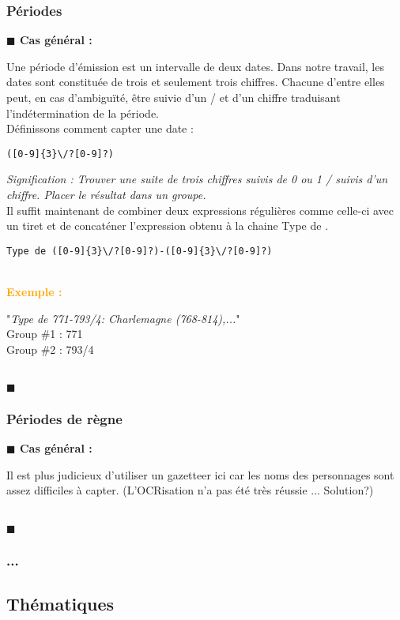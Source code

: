\documentclass[a4paper, 11pt]{article}
\newenvironment{general}
    {
    \noindent\textbf{\textcolor{dark-blue}{$\blacksquare$  Cas général : \\}}
    }
    {
    ~\\\noindent\textcolor{dark-blue}{$\blacksquare$}\\
    }
\newenvironment{exemple}
    {
    \noindent\textbf{\textcolor{orange}{
    Exemple : \\}}
    }
    {\\
    }
\begin{document}
\subsubsection{Périodes}
\begin{general}
Une période d'émission est un intervalle de deux dates. Dans notre travail, les dates sont constituée de trois et seulement trois chiffres. Chacune d'entre elles peut, en cas d’ambiguïté, être suivie d'un \og/\fg{} et d'un chiffre traduisant l'indétermination de la période.\\
 Définissons comment capter une date : 
\begin{verbatim}
([0-9]{3}\/?[0-9]?)
\end{verbatim}
\textit{Signification : Trouver une suite de trois chiffres suivis de 0 ou 1  \og/\fg{} suivis d'un chiffre. Placer le résultat dans un groupe.}\\

Il suffit maintenant de combiner deux expressions régulières comme celle-ci avec un tiret et de concaténer l'expression obtenu à la chaine \og Type de \fg{}.
\begin{verbatim}
Type de ([0-9]{3}\/?[0-9]?)-([0-9]{3}\/?[0-9]?)
\end{verbatim}
~\\
\begin{exemple}
"\emph{Type de 771-793/4: Charlemagne (768-814),...}" \\
Group \#1 : 771 \\
Group \#2 : 793/4
\end{exemple}
\end{general}

\subsubsection{Périodes de règne}
\begin{general}
Il est plus judicieux d'utiliser un gazetteer ici car les noms des personnages sont assez difficiles à capter. (L'OCRisation n'a pas été très réussie ... Solution?)
\end{general}
\subsubsection{...}
\newpage
\subsection{Thématiques}
\end{document}
